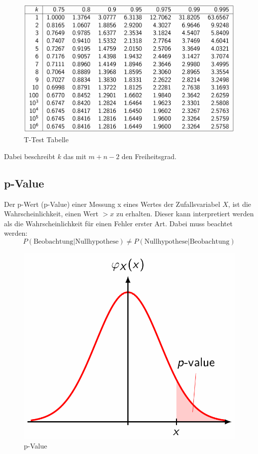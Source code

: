 \documentclass[../Main.tex]{subfiles}
\begin{document}
\begin{figure}[H]
    \centering
    \includegraphics[width=1\linewidth]{Images/t-test-tabelle.png}
    \caption{T-Test Tabelle}
\end{figure}
Dabei beschreibt \(k\) das mit \(m+n-2\) den Freiheitsgrad.

\subsection{p-Value}
Der p-Wert (p-Value) einer Messung x eines Wertes
der Zufallsvariabel \(X\), ist die Wahrscheinlichkeit,
einen Wert \(> x\) zu erhalten.
Dieser kann interpretiert werden als die Wahrscheinlichkeit für einen Fehler erster Art.
Dabei muss beachtet werden:
\begin{equation*}
    P(\text{Beobachtung}|\text{Nullhypothese}) \neq P(\text{Nullhypothese}|\text{Beobachtung})
\end{equation*}

\begin{figure}[H]
    \centering
    \includegraphics[width=0.5\linewidth]{Images/p-value.png}
    \caption{p-Value}
\end{figure}
\end{document}
